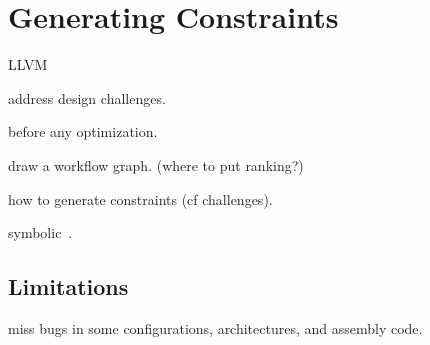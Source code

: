 \section{Generating Constraints}
\label{s:gen}

LLVM~\cite{lattner:llvm}

address design challenges.

before any optimization.

draw a workflow graph. (where to put ranking?)

how to generate constraints (cf challenges).

symbolic~\cite{engelen:symbolic}.

\subsection{Limitations}

miss bugs in some configurations, architectures,
and assembly code.
